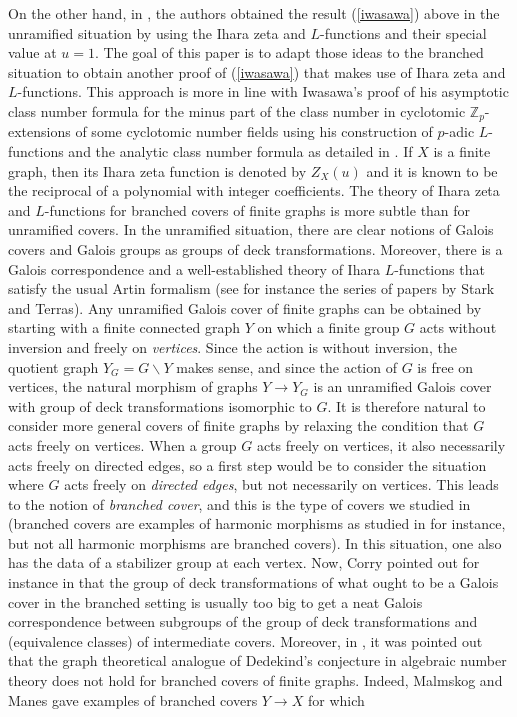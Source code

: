 \documentclass[11pt]{amsart}
\numberwithin{equation}{section}
\theoremstyle{remark}
\theoremstyle{definition}
\begin{document}
On the other hand, in \cite{Vallieres:2021,mcgownvallieresII,mcgownvallieresIII}, the authors obtained the result (\ref{iwasawa}) above in the unramified situation by using the Ihara zeta and $L$-functions and their special value at $u=1$.  The goal of this paper is to adapt those ideas to the branched situation to obtain another proof of (\ref{iwasawa}) that makes use of Ihara zeta and $L$-functions.  This approach is more in line with Iwasawa's proof of his asymptotic class number formula for the minus part of the class number in cyclotomic $\mathbb{Z}_{p}$-extensions of some cyclotomic number fields using his construction of $p$-adic $L$-functions and the analytic class number formula as detailed in \cite[\S 7]{Iwasawa:1972}.  If $X$ is a finite graph, then its Ihara zeta function is denoted by $Z_{X}(u)$ and it is known to be the reciprocal of a polynomial with integer coefficients.  The theory of Ihara zeta and $L$-functions for branched covers of finite graphs is more subtle than for unramified covers.  In the unramified situation, there are clear notions of Galois covers and Galois groups as groups of deck transformations.  Moreover, there is a Galois correspondence and a well-established theory of Ihara $L$-functions that satisfy the usual Artin formalism (see for instance the series of papers \cite{Stark/Terras:1996,Stark/Terras:2000,Stark/Terras:2007} by Stark and Terras).  Any unramified Galois cover of finite graphs can be obtained by starting with a finite connected graph $Y$ on which a finite group $G$ acts without inversion and freely on \emph{vertices}.  Since the action is without inversion, the quotient graph $Y_{G} = G \backslash Y$ makes sense, and since the action of $G$ is free on vertices, the natural morphism of graphs $Y \rightarrow Y_{G}$ is an unramified Galois cover with group of deck transformations isomorphic to $G$.  It is therefore natural to consider more general covers of finite graphs by relaxing the condition that $G$ acts freely on vertices.  When a group $G$ acts freely on vertices, it also necessarily acts freely on directed edges, so a first step would be to consider the situation where $G$ acts freely on \emph{directed edges}, but not necessarily on vertices.  This leads to the notion of \emph{branched cover}, and this is the type of covers we studied in \cite{Gambheera/Vallieres:2024} (branched covers are examples of harmonic morphisms as studied in \cite{Baker/Norine:2009} for instance, but not all harmonic morphisms are branched covers).  In this situation, one also has the data of a stabilizer group at each vertex.  Now, Corry pointed out for instance in \cite{Corry:2012} that the group of deck transformations of what ought to be a Galois cover in the branched setting is usually too big to get a neat Galois correspondence between subgroups of the group of deck transformations and (equivalence classes) of intermediate covers.  Moreover, in \cite{Malmskog/Manes:2010}, it was pointed out that the graph theoretical analogue of Dedekind's conjecture in algebraic number theory does not hold for branched covers of finite graphs.  Indeed, Malmskog and Manes gave examples of branched covers $Y \rightarrow X$ for which
\end{document}
